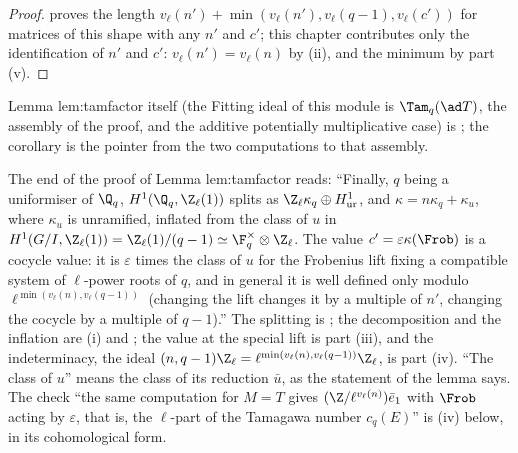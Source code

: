 \begin{proof}
 proves the length $v_\ell(n')+\min(v_\ell(n'),v_\ell(q-1),v_\ell(c'))$ for matrices of this shape with any $n'$ and $c'$; this chapter contributes only the
identification of $n'$ and $c'$: $v_\ell(n')=v_\ell(n)$ by (ii), and the minimum by part (v).
\end{proof}

\noindent Lemma lem:tamfactor itself (the Fitting ideal of this module is $\Tam_q(\ad T)$, the assembly of the proof, and the additive potentially multiplicative case) is
; the corollary is the pointer from the two computations to that assembly.

\begin{paperlink}\label{pl:galcoh:tamfactor}
The end of the proof of Lemma lem:tamfactor reads: ``Finally, $q$ being a uniformiser of $\Q_q$, $H^1(\Q_q,\Z_\ell(1))$ splits as
$\Z_\ell\kappa_q\oplus H^1_{\mathrm{ur}}$, and $\kappa=n\kappa_q+\kappa_u$, where $\kappa_u$ is unramified, inflated from the class of $u$ in
$H^1(G/I,\Z_\ell(1))=\Z_\ell(1)/(q-1)\simeq\F_q^\times\otimes\Z_\ell$. The value $c'=\varepsilon\kappa(\Frob)$ is a cocycle value: it is $\varepsilon$ times the class of $u$ for the
Frobenius lift fixing a compatible system of $\ell$-power roots of $q$, and in general it is well defined only modulo $\ell^{\min(v_\ell(n),v_\ell(q-1))}$ (changing the lift
changes it by a multiple of $n'$, changing the cocycle by a multiple of $q-1$).'' The splitting is ; the decomposition and the
inflation are (i) and ; the value at the special lift is part (iii), and the indeterminacy, the
ideal $(n,q-1)\Z_\ell=\ell^{\min(v_\ell(n),v_\ell(q-1))}\Z_\ell$, is part (iv). ``The class of $u$'' means the class of its reduction $\bar u$, as the statement of the lemma
says. The check ``the same computation for $M=T$ gives $(\Z/\ell^{v_\ell(n)})\bar e_1$ with $\Frob$ acting by $\varepsilon$, that is, the $\ell$-part of the Tamagawa number
$c_q(E)$'' is (iv) below, in its cohomological form.
\end{paperlink}

